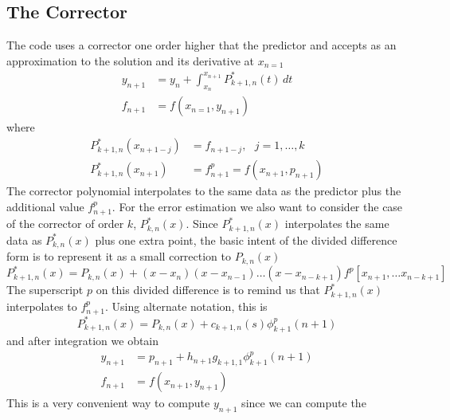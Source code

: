 \subsection{The Corrector}\label{ssec:integrator-corrector}
The code uses a corrector one order higher that the predictor and accepts as an 
approximation to the solution and its derivative at $x_{n=1}$
\begin{equation}
    \begin{aligned}
        y_{n+1} &= y_n + \int_{x_n}^{x_{n+1}} P^{*}_{k+1,n}(t) \,dt \\
        f_{n+1} &= f(x_{n=1}, y_{n+1})
    \end{aligned}
\end{equation}
where
\begin{equation}
    \begin{aligned}
        P^{*}_{k+1,n}(x_{n+1-j}) &= f_{n+1-j}, \text{ } j=1,\dots ,k \\
        P^{*}_{k+1,n}(x_{n+1}) &= f^{p}_{n+1} = f(x_{n+1}, p_{n+1})
    \end{aligned}
\end{equation}
The corrector polynomial interpolates to the same data as the predictor plus 
the additional value $f^{p}_{n+1}$. For the error estimation we also want to consider 
the case of the corrector of order $k$, $P^{*}_{k,n}(x)$. 
Since $P^{*}_{k+1,n}(x)$ interpolates the same data as $P^{*}_{k,n}(x)$ plus one 
extra point, the basic intent of the divided difference form is to represent it as a small 
correction to $P_{k,n}(x)$
\begin{equation}\label{eq:sg512}
    P^{*}_{k+1,n}(x) = P_{k,n}(x) + (x-x_n)(x-x_{n-1})\dots (x-x_{n-k+1})
        f^{p}[x_{n+1}, \dots x_{n-k+1}]
\end{equation}
The superscript $p$ on this divided difference is to remind us that $P^{*}_{k+1,n}(x)$ 
interpolates to $f^{p}_{n+1}$. 
Using alternate notation, this is 
\begin{equation}
    P^{*}_{k+1,n}(x) = P_{k,n}(x) + c_{k+1,n}(s) \phi ^{p}_{k+1} (n+1)
\end{equation}
and after integration we obtain
\begin{equation}\label{eq:sg513}
    \begin{aligned}
        y_{n+1} &= p_{n+1} + h_{n+1} g_{k+1,1} \phi ^{p}_{k+1} (n+1) \\
        f_{n+1} &= f(x_{n+1}, y_{n+1})
    \end{aligned}
\end{equation}
This is a very convenient way to compute $y_{n+1}$ since we can compute the 
